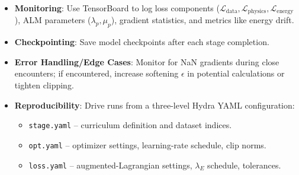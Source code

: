 \begin{itemize}
    \item \textbf{Monitoring}: Use TensorBoard to log loss components ($\mathcal{L}_{\text{data}}, \mathcal{L}_{\text{physics}}, \mathcal{L}_{\text{energy}}$), ALM parameters ($\lambda_p, \mu_p$), gradient statistics, and metrics like energy drift.
    \item \textbf{Checkpointing}: Save model checkpoints after each stage completion.
    \item \textbf{Error Handling/Edge Cases}: Monitor for NaN gradients during close encounters; if encountered, increase softening $\epsilon$ in potential calculations or tighten clipping.
    \item \textbf{Reproducibility}: Drive runs from a three-level Hydra YAML configuration:
    \begin{itemize}
        \item \texttt{stage.yaml} -- curriculum definition and dataset indices.
        \item \texttt{opt.yaml} -- optimizer settings, learning-rate schedule, clip norms.
        \item \texttt{loss.yaml} -- augmented-Lagrangian settings, $\lambda_E$ schedule, tolerances.
    \end{itemize}
\end{itemize}







